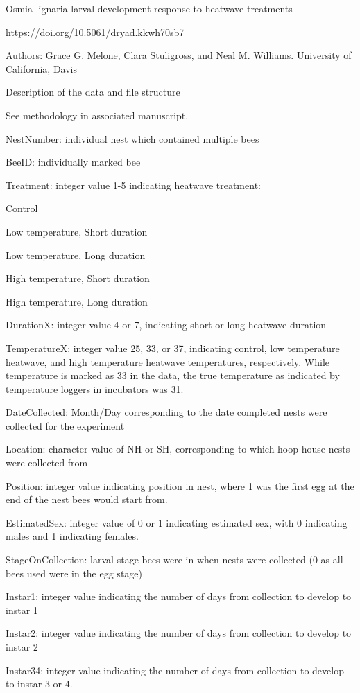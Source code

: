 Osmia lignaria larval development response to heatwave treatments

https://doi.org/10.5061/dryad.kkwh70sb7

Authors: Grace G. Melone, Clara Stuligross, and Neal M. Williams. University of California, Davis

Description of the data and file structure

See methodology in associated manuscript. 

NestNumber: individual nest which contained multiple bees

BeeID: individually marked bee 

Treatment: integer value 1-5 indicating heatwave treatment: 

Control

Low temperature, Short duration

Low temperature, Long duration

High temperature, Short duration

High temperature, Long duration 

DurationX: integer value 4 or 7, indicating short or long heatwave duration 

TemperatureX: integer value 25, 33, or 37, indicating control, low temperature heatwave, and high temperature heatwave temperatures, respectively. While temperature is marked as 33 in the data, the true temperature as indicated by temperature loggers in incubators was 31. 

DateCollected: Month/Day corresponding to the date completed nests were collected for the experiment 

Location: character value of NH or SH, corresponding to which hoop house nests were collected from

Position: integer value indicating position in nest, where 1 was the first egg at the end of the nest bees would start from. 

EstimatedSex: integer value of 0 or 1 indicating estimated sex, with 0 indicating males and 1 indicating females. 

StageOnCollection: larval stage bees were in when nests were collected (0 as all bees used were in the egg stage)

Instar1: integer value indicating the number of days from collection to develop to instar 1

Instar2: integer value indicating the number of days from collection to develop to instar 2

Instar34: integer value indicating the number of days from collection to develop to instar 3 or 4.

